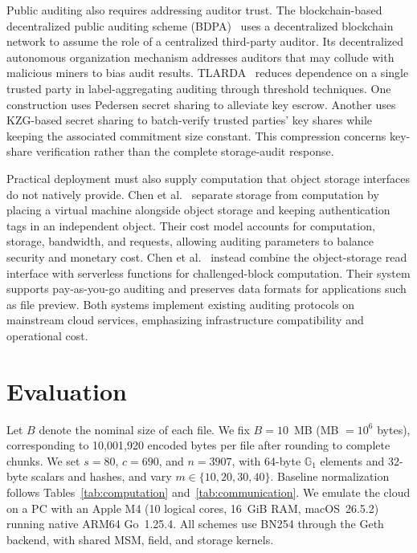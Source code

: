 \documentclass[lettersize,journal]{IEEEtran}
\newcommand{\GG}{\mathbb{G}}
\newcommand{\Store}{\ensuremath{\mathsf{Store}}}
\newcommand{\Verify}{\ensuremath{\mathsf{Verify}}}
\begin{document}
Public auditing also requires addressing auditor trust. The blockchain-based decentralized public auditing scheme (BDPA)~\cite{Shu2022BlockchainAudit} uses a decentralized blockchain network to assume the role of a centralized third-party auditor. Its decentralized autonomous organization mechanism addresses auditors that may collude with malicious miners to bias audit results. TLARDA~\cite{Liu2025TLARDA} reduces dependence on a single trusted party in label-aggregating auditing through threshold techniques. One construction uses Pedersen secret sharing to alleviate key escrow. Another uses KZG-based secret sharing to batch-verify trusted parties' key shares while keeping the associated commitment size constant. This compression concerns key-share verification rather than the complete storage-audit response.

Practical deployment must also supply computation that object storage interfaces do not natively provide. Chen et al.~\cite{Chen2024ObjectAuditing} separate storage from computation by placing a virtual machine alongside object storage and keeping authentication tags in an independent object. Their cost model accounts for computation, storage, bandwidth, and requests, allowing auditing parameters to balance security and monetary cost. Chen et al.~\cite{Chen2024ServerlessAuditing} instead combine the object-storage read interface with serverless functions for challenged-block computation. Their system supports pay-as-you-go auditing and preserves data formats for applications such as file preview. Both systems implement existing auditing protocols on mainstream cloud services, emphasizing infrastructure compatibility and operational cost.

\section{Evaluation}
\label{sec:evaluation}
Let $B$ denote the nominal size of each file. We fix $B=10$~MB (MB $=10^6$ bytes), corresponding to 10,001,920 encoded bytes per file after rounding to complete chunks. We set $s=80$, $c=690$, and $n=3907$, with 64-byte $\GG_1$ elements and 32-byte scalars and hashes, and vary $m\in\{10,20,30,40\}$. Baseline normalization follows Tables~\ref{tab:computation} and~\ref{tab:communication}. We emulate the cloud on a PC with an Apple M4 (10 logical cores, 16~GiB RAM, macOS~26.5.2) running native ARM64 Go~1.25.4. All schemes use BN254 through the Geth backend, with shared MSM, field, and storage kernels.
\end{document}
